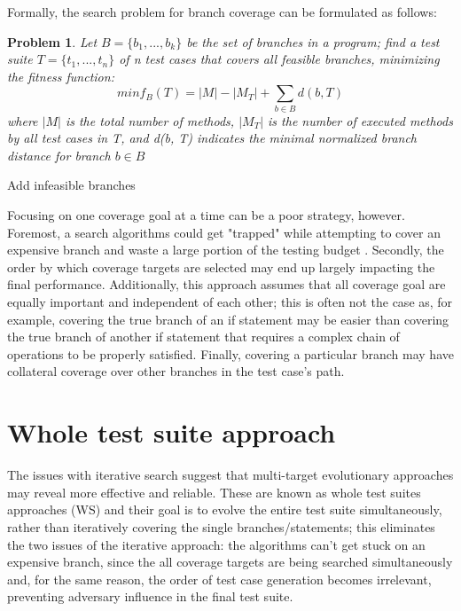 Formally, the search problem for branch coverage can be formulated as follows:
\newtheorem{prob}{Problem}
\begin{prob}
    Let $ B = \{b_1,...,b_k\} $ be the set of branches in a program; find a test suite $ T = \{t_1,...,t_n \} $ of n test cases that covers all feasible branches, minimizing the fitness function:
    \begin{equation}
        min f_B (T) = |M| - |M_T| + \sum_{b \in B} d(b, T)
    \end{equation}
    where $|M|$ is the total number of methods, $|M_T|$ is the number of executed methods by all test cases in T, and d(b, T) indicates the minimal normalized branch distance for branch $ b \in B $
\end{prob}


Add infeasible branches

Focusing on one coverage goal at a time can be a poor strategy, however. Foremost, a search algorithms could get "trapped" while attempting to cover an expensive branch and waste a large portion of the testing budget \cite{DBLP:journals/tse/FraserA13}.
Secondly, the order by which coverage targets are selected may end up largely impacting the final performance.
Additionally, this approach assumes that all coverage goal are equally important and independent of each other; this is often not the case as, for example, covering the true branch of an if statement may be easier than covering the true branch of another if statement that requires a complex chain of operations to be properly satisfied. Finally, covering a particular branch may have collateral coverage over other branches in the test case's path.


\section{Whole test suite approach}
The issues with iterative search suggest that multi-target evolutionary approaches may reveal more effective and reliable. These are known as whole test suites approaches (WS) \cite{QSIC11} and their goal is to evolve the entire test suite simultaneously, rather than iteratively covering the single branches/statements; this eliminates the two issues of the iterative approach: the algorithms can't get stuck on an expensive branch, since the all coverage targets are being searched simultaneously and, for the same reason, the order of test case generation becomes irrelevant, preventing adversary influence in the final test suite.


